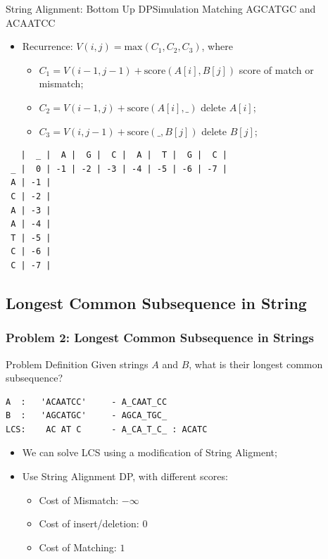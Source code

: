 \begin{frame}[fragile]{String Alignment: Bottom Up DP}{Simulation Matching AGCATGC and ACAATCC}

\begin{itemize}
  \item Recurrence: $V(i,j) = \text{max}(C_1, C_2, C_3)$, where
  \begin{itemize}
    \item $C_1 = V(i-1, j-1) + \text{score}(A[i],B[j])$ \hfill score of match or mismatch;
    \item $C_2 = V(i-1,j) + \text{score}(A[i],\_)$ \hfill delete $A[i]$;
    \item $C_3 = V(i,j-1) + \text{score}(\_,B[j])$ \hfill delete $B[j]$;
  \end{itemize}
\end{itemize}

\begin{verbatim}
   |  _ |  A |  G |  C |  A |  T |  G |  C |
 _ |  0 | -1 | -2 | -3 | -4 | -5 | -6 | -7 |
 A | -1 |
 C | -2 |
 A | -3 |
 A | -4 |
 T | -5 |
 C | -6 |
 C | -7 |
\end{verbatim}

\end{frame}


\subsection{Longest Common Subsequence in String}

\begin{frame}[fragile]
  \frametitle{Problem 2: Longest Common Subsequence in Strings}
    \begin{block}{Problem Definition}
      Given strings $A$ and $B$, what is their longest common subsequence?\medskip

\begin{verbatim}
A  :   'ACAATCC'     - A_CAAT_CC
B  :   'AGCATGC'     - AGCA_TGC_
LCS:    AC AT C      - A_CA_T_C_ : ACATC
\end{verbatim}
    \end{block}\bigskip

  \begin{itemize}
    \item We can solve LCS using a modification of String Aligment;
    \item Use String Alignment DP, with different scores:
    \begin{itemize}
      \item Cost of Mismatch: $-\infty$
      \item Cost of insert/deletion: $0$
      \item Cost of Matching: $1$
    \end{itemize}
  \end{itemize}
\end{frame}

